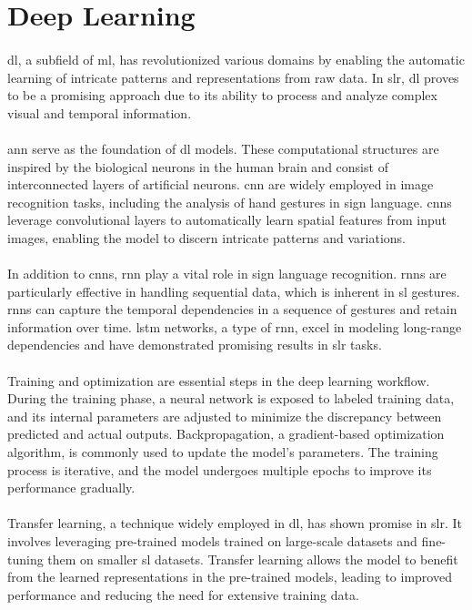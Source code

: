 \section{Deep Learning}
\paragraph{}
\ac{dl}, a subfield of \ac{ml}, has revolutionized various domains by enabling the automatic learning of intricate patterns and representations from raw data. In \ac{slr}, \ac{dl} proves to be a promising approach due to its ability to process and analyze complex visual and temporal information.
\paragraph{}
\ac{ann} serve as the foundation of \ac{dl} models. These computational structures are inspired by the biological neurons in the human brain and consist of interconnected layers of artificial neurons. \ac{cnn} are widely employed in image recognition tasks, including the analysis of hand gestures in sign language. \ac{cnn}s leverage convolutional layers to automatically learn spatial features from input images, enabling the model to discern intricate patterns and variations.
\paragraph{}
In addition to \ac{cnn}s, \ac{rnn} play a vital role in sign language recognition. \ac{rnn}s are particularly effective in handling sequential data, which is inherent in \ac{sl} gestures. \ac{rnn}s can capture the temporal dependencies in a sequence of gestures and retain information over time. \ac{lstm} networks, a type of \ac{rnn}, excel in modeling long-range dependencies and have demonstrated promising results in \ac{slr} tasks.
\paragraph{}
Training and optimization are essential steps in the deep learning workflow. During the training phase, a neural network is exposed to labeled training data, and its internal parameters are adjusted to minimize the discrepancy between predicted and actual outputs. Backpropagation, a gradient-based optimization algorithm, is commonly used to update the model's parameters. The training process is iterative, and the model undergoes multiple epochs to improve its performance gradually.
\paragraph{}
Transfer learning, a technique widely employed in \ac{dl}, has shown promise in \ac{slr}. It involves leveraging pre-trained models trained on large-scale datasets and fine-tuning them on smaller \ac{sl} datasets. Transfer learning allows the model to benefit from the learned representations in the pre-trained models, leading to improved performance and reducing the need for extensive training data.
